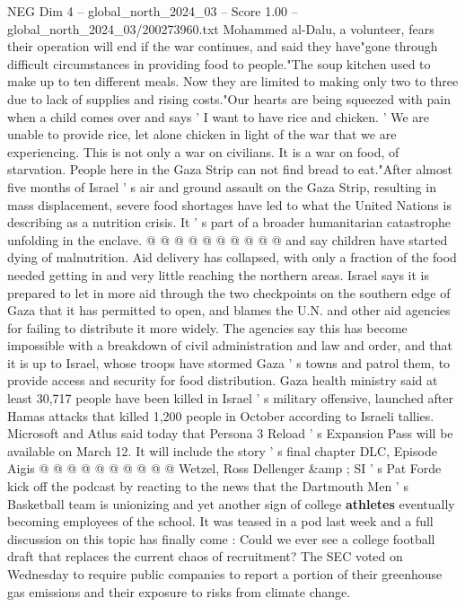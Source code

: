 \begin{textsample}{NEG Dim 4 – global\_north\_2024\_03 – Score 1.00 – global\_north\_2024\_03/200273960.txt}  \label{ex:f4_neg_229}
Mohammed al-Dalu, a volunteer, fears their operation will end if the war continues, and said they have"gone through difficult circumstances in providing food to people."The soup kitchen used to make up to ten different meals.
Now they are limited to making only two to three due to lack of supplies and rising costs."Our hearts are being squeezed with pain when a child comes over and says ' I want to have rice and chicken. ' We are unable to provide rice, let alone chicken in light of the war that we are experiencing.
This is not only a war on civilians.
It is a war on food, of starvation.
People here in the Gaza Strip can not find bread to eat."After almost five months of Israel ' s air and ground assault on the Gaza Strip, resulting in mass displacement, severe food shortages have led to what the United Nations is describing as a nutrition crisis.
It ' s part of a broader humanitarian catastrophe unfolding in the enclave. @ @ @ @ @ @ @ @ @ @ and say children have started dying of malnutrition.
Aid delivery has collapsed, with only a fraction of the food needed getting in and very little reaching the northern areas.
Israel says it is prepared to let in more aid through the two checkpoints on the southern edge of Gaza that it has permitted to open, and blames the U.N. and other aid agencies for failing to distribute it more widely.
The agencies say this has become impossible with a breakdown of civil administration and law and order, and that it is up to Israel, whose troops have stormed Gaza ' s towns and patrol them, to provide access and security for food distribution.
Gaza health ministry said at least 30,717 people have been killed in Israel ' s military offensive, launched after Hamas attacks that killed 1,200 people in October according to Israeli tallies.
Microsoft and Atlus said today that Persona 3 Reload ' s Expansion Pass will be available on March 12.
It will include the story ' s final chapter DLC, Episode Aigis @ @ @ @ @ @ @ @ @ @ Wetzel, Ross Dellenger \&amp ; SI ' s Pat Forde kick off the podcast by reacting to the news that the Dartmouth Men ' s Basketball team is unionizing and yet another sign of college \textbf{athletes} eventually becoming employees of the school.
It was teased in a pod last week and a full discussion on this topic has finally come : Could we ever see a college football draft that replaces the current chaos of recruitment?
The SEC voted on Wednesday to require public companies to report a portion of their greenhouse gas emissions and their exposure to risks from climate change.

\end{textsample}
